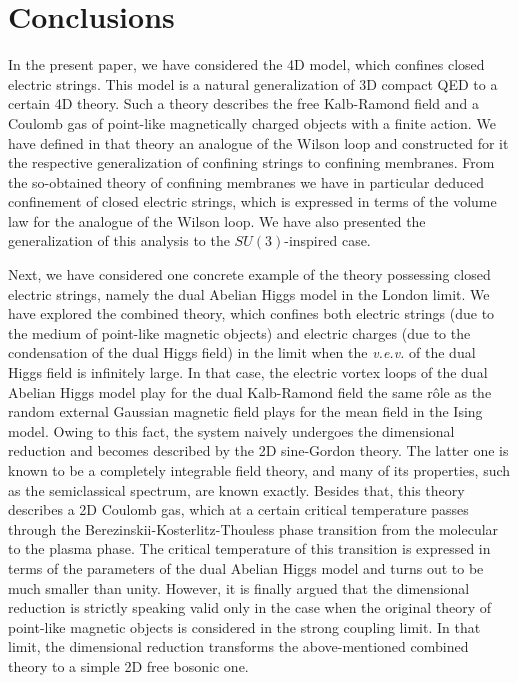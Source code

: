 \documentclass[a4paper,12pt]{article}
\begin{document}
\section{Conclusions}

In the present paper, we have considered the 4D model, which confines closed electric strings. This model
is a natural generalization of 3D compact QED to a certain 4D theory. Such a theory describes the free Kalb-Ramond field 
and a Coulomb gas of point-like magnetically charged 
objects with a finite action. We have defined in that theory an analogue of the Wilson loop and constructed for it the respective generalization 
of confining strings to confining membranes. From the so-obtained theory of confining membranes 
we have in particular deduced confinement of closed electric strings, which 
is expressed in terms of the volume law for the analogue of the Wilson loop. We have also presented the generalization of
this analysis to the $SU(3)$-inspired case. 

Next, we have considered one concrete example 
of the theory possessing closed electric strings, namely the dual Abelian Higgs model in the London limit. We have explored the 
combined theory, which confines both electric strings (due to the medium of point-like magnetic objects) and electric 
charges (due to the condensation of the dual Higgs field) in the limit when the {\it v.e.v.} of the dual Higgs field is 
infinitely large. In that case, the electric vortex loops of the dual Abelian Higgs model play for the dual Kalb-Ramond field
the same r\^ole as the random external Gaussian magnetic field plays for the mean field in the Ising model. Owing to this fact,
the system naively undergoes the dimensional reduction and becomes described by the 2D sine-Gordon theory. The latter one is known 
to be a completely integrable field theory, and many of its properties, such as the semiclassical spectrum, are known exactly.
Besides that, this theory describes a 2D Coulomb gas, which at a certain critical temperature passes through the 
Berezinskii-Kosterlitz-Thouless phase transition from the molecular to the plasma phase. The critical temperature 
of this transition is expressed in terms of the parameters of the dual Abelian Higgs model and turns out to be 
much smaller than unity. However, it is finally argued that the dimensional reduction is strictly speaking valid only in the 
case when the original theory of point-like magnetic objects is considered in the strong coupling limit. In that limit, the dimensional
reduction transforms the above-mentioned combined theory to a simple 2D free bosonic one.
\end{document}
